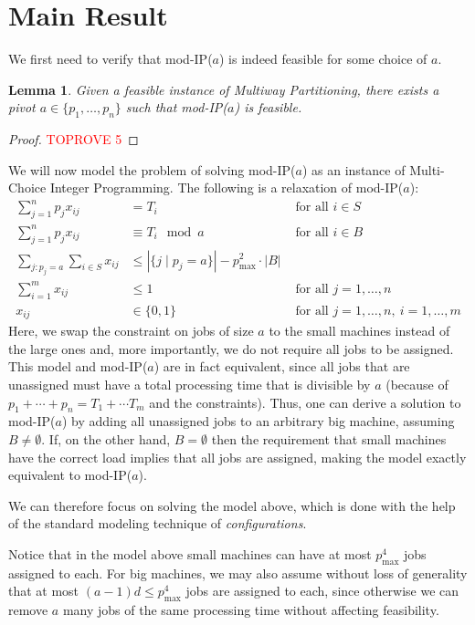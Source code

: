 \documentclass{article}
\newcommand{\mIP}{mod-IP($a$)}
\newtheorem{lemma}[theorem]{Lemma}
\begin{document}
\section{Main Result}
\label{sec:appl}
We first need to verify that \mIP{} is indeed feasible for some choice of $a$.
\begin{lemma}
	Given a feasible instance of Multiway Partitioning, there exists a pivot $a\in \{p_1,\dotsc,p_n\}$
	such that \mIP{} is feasible.
\end{lemma}
\begin{proof}\textcolor{red}{TOPROVE 5}\end{proof}
We will now model the problem of solving \mIP{} as an instance
of Multi-Choice Integer Programming.
The following is a relaxation of \mIP{}:
\begin{align*}
	\sum_{j=1}^n p_j x_{ij} &= T_i &\text{ for all } i\in S \\
	\sum_{j=1}^n p_j x_{ij} &\equiv T_i \mod a &\text{ for all } i\in B \\
	\sum_{j : p_j = a}\sum_{i\in S} x_{ij} &\le |\{j \mid p_j = a\}| - p_{\max}^2 \cdot |B| & \\
	\sum_{i=1}^m x_{ij} &\le 1 &\text{ for all } j=1,\dotsc,n \\
	x_{ij} &\in \{0, 1\} &\text{ for all } j=1,\dotsc,n,\ i=1,\dotsc,m
\end{align*}
Here, we swap the constraint on jobs of size $a$ to the small machines instead of the large ones
and, more importantly, we do not require all jobs to be assigned.
This model and \mIP{} are in fact equivalent, since all jobs that are unassigned must have a total processing time
that is divisible by $a$ (because of $p_1 + \cdots + p_n = T_1 + \cdots T_m$ and the constraints). Thus,
one can derive a solution to \mIP{} by adding all unassigned jobs to an arbitrary big machine, assuming
$B\neq \emptyset$.
If, on the other hand, $B = \emptyset$ then the requirement that small machines have the correct load implies that all
jobs are assigned, making the model exactly equivalent to \mIP{}.

We can therefore focus on solving the model above, which is done with the help of the standard modeling technique 
of \emph{configurations}. 

Notice that in the model above small machines can have at most $p_{\max}^4$ jobs assigned
to each. For big machines, we may also assume without loss of generality that at most $(a-1)d \le p_{\max}^4$ jobs are
assigned to each, since otherwise we can remove $a$ many jobs of the same processing time without affecting feasibility. 
\end{document}
